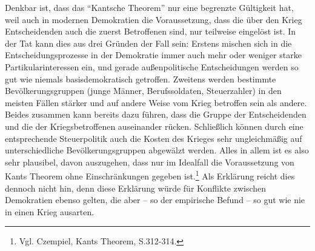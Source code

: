 \documentclass[12pt,a4paper,ngerman]{article}
\begin{document}
Denkbar ist, dass das "`Kantsche Theorem"' nur eine begrenzte
Gültigkeit hat, weil auch in modernen Demokratien die Voraussetzung,
dass die über den Krieg Entscheidenden auch die zuerst Betroffenen
sind, nur teilweise eingelöst ist. In der Tat kann dies aus drei
Gründen der Fall sein: Erstens mischen sich in die
Entscheidungsprozesse in der Demokratie immer auch mehr oder weniger
starke Partikularinteressen ein, und gerade außenpolitische
Entscheidungen werden so gut wie niemals basisdemokratisch getroffen.
Zweitens werden bestimmte Bevölkerungsgruppen (junge Männer,
Berufssoldaten, Steuerzahler) in den meisten Fällen stärker und auf
andere Weise vom Krieg betroffen sein als andere. Beides zusammen kann
bereits dazu führen, dass die Gruppe der Entscheidenden und die der
Kriegsbetroffenen auseinander rücken. Schließlich können durch eine
entsprechende Steuerpolitik auch die Kosten des Krieges sehr
ungleichmäßig auf unterschiedliche Bevölkerungsgruppen abgewälzt
werden. Alles in allem ist es also sehr plausibel, davon auszugehen,
dass nur im Idealfall die Voraussetzung von Kants Theorem ohne
Einschränkungen gegeben ist.\footnote{Vgl. Czempiel, Kants Theorem,
  S.312-314.} Als Erklärung reicht dies dennoch nicht hin, denn diese
Erklärung würde für Konflikte zwischen Demokratien ebenso gelten, die
aber -- so der empirische Befund -- so gut wie nie in einen Krieg
ausarten.
\end{document}
